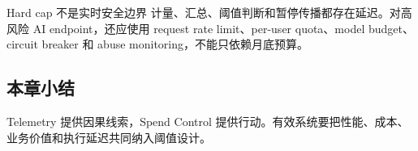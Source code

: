 \begin{warningbox}{Hard cap 不是实时安全边界}
计量、汇总、阈值判断和暂停传播都存在延迟。对高风险 AI endpoint，还应使用 request rate limit、per-user quota、model budget、circuit breaker 和 abuse monitoring，不能只依赖月底预算。
\end{warningbox}


\subsection{本章小结}

Telemetry 提供因果线索，Spend Control 提供行动。有效系统要把性能、成本、业务价值和执行延迟共同纳入阈值设计。

